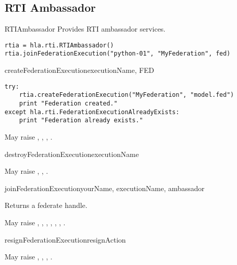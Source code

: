 \subsection{RTI Ambassador}

\begin{classdesc}{RTIAmbassador}{}
Provides RTI ambassador services.

\begin{verbatim}
rtia = hla.rti.RTIAmbassador()
rtia.joinFederationExecution("python-01", "MyFederation", fed)
\end{verbatim}

\medskip
{}

\begin{methoddesc}{createFederationExecution}{executionName, FED}

\begin{verbatim} 
try:
    rtia.createFederationExecution("MyFederation", "model.fed")
    print "Federation created."
except hla.rti.FederationExecutionAlreadyExists:
    print "Federation already exists."
\end{verbatim}

May raise
,
,
,
.
\end{methoddesc}

\begin{methoddesc}{destroyFederationExecution}{executionName}

May raise
,
,
.
\end{methoddesc}

\begin{methoddesc}{joinFederationExecution}{yourName, executionName, ambassador}

Returns a federate handle.

May raise
,
,
,
,
,
,
.
\end{methoddesc}

\begin{methoddesc}{resignFederationExecution}{resignAction}

May raise
,
,
,
.
\end{methoddesc}


\end{classdesc}
